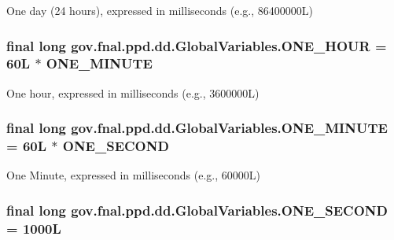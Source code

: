 One day (24 hours), expressed in milliseconds (e.\-g., 86400000\-L) \hypertarget{classgov_1_1fnal_1_1ppd_1_1dd_1_1GlobalVariables_a947f75994e24bb52604adf3699920579}{
\subsubsection[{O\-N\-E\-\_\-\-H\-O\-U\-R}]{\setlength{\rightskip}{0pt plus 5cm}final long gov.\-fnal.\-ppd.\-dd.\-Global\-Variables.\-O\-N\-E\-\_\-\-H\-O\-U\-R = 60\-L $\ast$ O\-N\-E\-\_\-\-M\-I\-N\-U\-T\-E\hspace{0.3cm}{\ttfamily [static]}}}\label{classgov_1_1fnal_1_1ppd_1_1dd_1_1GlobalVariables_a947f75994e24bb52604adf3699920579}
One hour, expressed in milliseconds (e.\-g., 3600000\-L) \hypertarget{classgov_1_1fnal_1_1ppd_1_1dd_1_1GlobalVariables_a79fc1e35198b44168537a85aa4c2d942}{
\subsubsection[{O\-N\-E\-\_\-\-M\-I\-N\-U\-T\-E}]{\setlength{\rightskip}{0pt plus 5cm}final long gov.\-fnal.\-ppd.\-dd.\-Global\-Variables.\-O\-N\-E\-\_\-\-M\-I\-N\-U\-T\-E = 60\-L $\ast$ O\-N\-E\-\_\-\-S\-E\-C\-O\-N\-D\hspace{0.3cm}{\ttfamily [static]}}}\label{classgov_1_1fnal_1_1ppd_1_1dd_1_1GlobalVariables_a79fc1e35198b44168537a85aa4c2d942}
One Minute, expressed in milliseconds (e.\-g., 60000\-L) \hypertarget{classgov_1_1fnal_1_1ppd_1_1dd_1_1GlobalVariables_a3718d8133f257fcc337f5131c8e22d48}{
\subsubsection[{O\-N\-E\-\_\-\-S\-E\-C\-O\-N\-D}]{\setlength{\rightskip}{0pt plus 5cm}final long gov.\-fnal.\-ppd.\-dd.\-Global\-Variables.\-O\-N\-E\-\_\-\-S\-E\-C\-O\-N\-D = 1000\-L\hspace{0.3cm}{\ttfamily [static]}}}\label{classgov_1_1fnal_1_1ppd_1_1dd_1_1GlobalVariables_a3718d8133f257fcc337f5131c8e22d48}
